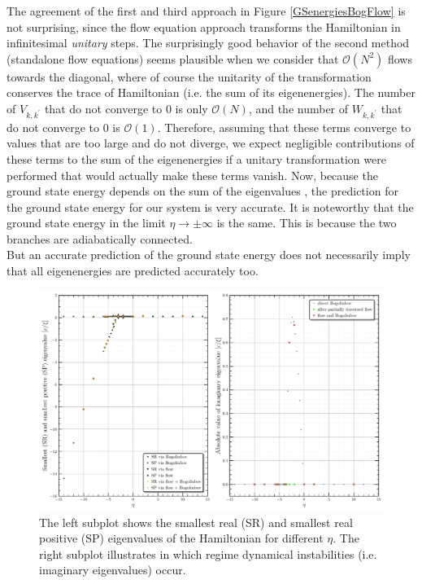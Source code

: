 The agreement of the first and third approach in Figure \ref{GSenergiesBogFlow} is not surprising, since the flow equation approach transforms the Hamiltonian in infinitesimal \emph{unitary} steps. The surprisingly good behavior of the second method (standalone flow equations) seems plausible when we consider that $\mathcal O(N^2)$ flows towards the diagonal, where of course the unitarity of the transformation conserves the trace of Hamiltonian (i.e. the sum of its eigenenergies). The number of $V_{k,k^\prime}$ that do not converge to 0 is only $\mathcal O(N)$, and the number of $W_{k,k^\prime}$ that do not converge to 0 is $\mathcal O(1)$. Therefore, assuming that these terms converge to values that are too large and do not diverge, we expect negligible contributions of these terms to the sum of the eigenenergies if a unitary transformation were performed that would actually make these terms vanish. Now, because the ground state energy depends on the sum of the eigenvalues \cite{PracticalTraining}, the prediction for the ground state energy for our system is very accurate. It is noteworthy that the ground state energy in the limit $\eta\rightarrow\pm\infty$ is the same. This is because the two branches are adiabatically connected\cite{Grusdt_2017}.\\
But an accurate prediction of the ground state energy does not necessarily imply that all eigenenergies are predicted accurately too. 
\begin{figure}[H]
    \centering
    \includegraphics[width=\textwidth]{figures/plots/PDF/spectrum_analysis_bog_flow_comp.pdf}
    \caption[Characteristic eigenenergies of the Bose Polaron for different $\eta$]{The left subplot shows the smallest real (SR) and smallest real positive (SP) eigenvalues of the Hamiltonian for different $\eta$. The right subplot illustrates in which regime dynamical instabilities (i.e. imaginary eigenvalues) occur.
}
    \label{SpectrumAnalysis}
\end{figure}
